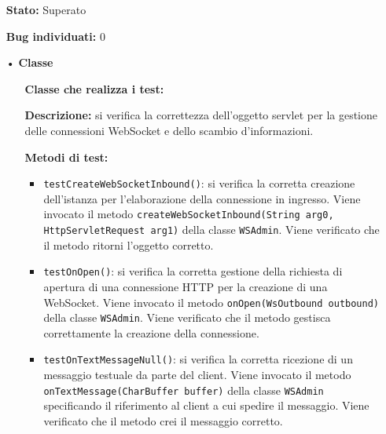 {\begin{sloppypar}
{\begin{itemize}
\begin{itemize}
\begin{itemize}
						\item \texttt{testRequestOpUserList()}: si verifica la corretta chiamata del metodo privato che effettua la richiesta per l'ottenimento della lista utenti. L'oggetto \texttt{xml} contiene un elemento corretto di tipo comunicazione.
					\end{itemize}
					\item[] \textbf{Stato:} Superato

					\item[] \textbf{Bug individuati:} 0
				\end{itemize}	
			\end{itemize}
			
			\begin{itemize}
				\item[•]\textbf{Classe } 
				\begin{itemize}
					\item[] \textbf{Classe che realizza i test:} \\ 

					\item[] \textbf{Descrizione:} si verifica la correttezza dell'oggetto servlet per la gestione delle connessioni WebSocket e dello scambio d'informazioni.

					\item[] \textbf{Metodi di test:}
					\begin{itemize}
						\item \texttt{testCreateWebSocketInbound()}: si verifica la corretta creazione dell'istanza per l'elaborazione della connessione in ingresso. Viene invocato il metodo \texttt{createWebSocketInbound(String arg0, HttpServletRequest arg1)} della classe \texttt{WSAdmin}. Viene verificato che il metodo ritorni l'oggetto corretto.
						
						\item \texttt{testOnOpen()}: si verifica la corretta gestione della richiesta di apertura di una connessione HTTP per la creazione di una WebSocket. Viene invocato il metodo \texttt{onOpen(WsOutbound outbound)} della classe \texttt{WSAdmin}. Viene verificato che il metodo gestisca correttamente la creazione della connessione.				
						
						\item \texttt{testOnTextMessageNull()}: si verifica la corretta ricezione di un messaggio testuale da parte del client. Viene invocato il metodo \texttt{onTextMessage(CharBuffer buffer)} della classe \texttt{WSAdmin} specificando il riferimento al client a cui spedire il messaggio. Viene verificato che il metodo crei il messaggio corretto.						
						

\end{itemize}
\end{itemize}
\end{itemize}}
\end{sloppypar}}
